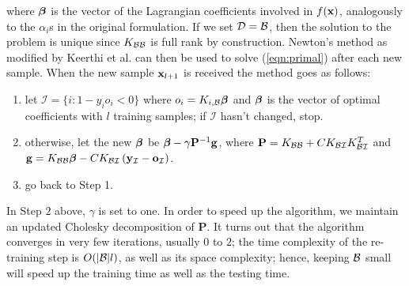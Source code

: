 \noindent where $\boldsymbol{\beta}$ is the vector of the Lagrangian coefficients involved
in $f(\mathbf{x})$, analogously to the $\alpha_i$s in the original
formulation. If we set $\mathcal{D} = \mathcal{B}$, then the solution to the problem is
unique since $K_{\mathcal{B}\mathcal{B}}$ is full rank by construction. Newton's method
as modified by Keerthi et al. \cite{KeerthiDC05,KeerthiCDC06} can then
be used to solve (\ref{eqn:primal}) after each new sample. When the
new sample $\mathbf{x}_{l+1}$ is received the method goes as follows:

\begin{enumerate}

   \item let $\mathcal{I} = \{ i: 1-y_i o_i<0 \}$ where $o_i =
     K_{i,\mathcal{B}} \boldsymbol{\beta}$ and $\boldsymbol{\beta}$ is the vector of optimal coefficients
     with $l$ training samples; if $\mathcal{I}$ hasn't changed, stop.

   \item otherwise, let the new $\boldsymbol{\beta}$ be $\boldsymbol{\beta} - \gamma
     \mathbf{P}^{-1}\mathbf{g}$, where $\mathbf{P} = K_{\mathcal{B}\mathcal{B}} + C
     K_{\mathcal{B}\mathcal{I}} K_{\mathcal{B}\mathcal{I}}^T$ and $\mathbf{g} = K_{\mathcal{B}\mathcal{B}}
     \boldsymbol{\beta} - C K_{\mathcal{B}\mathcal{I}} \left(
     \mathbf{y}_{\mathcal{I}}-\mathbf{o}_{\mathcal{I}}\right)$.

   \item go back to Step 1.

\end{enumerate}

In Step $2$ above, $\gamma$ is set to one. In order to speed up the
algorithm, we maintain an updated Cholesky decomposition of
$\mathbf{P}$. It turns out that the algorithm converges in very few
iterations, usually $0$ to $2$; the time complexity of the re-training
step is $O(|\mathcal{B}|l)$, as well as its space complexity; hence, keeping
$\mathcal{B}$ small will speed up the training time as well as the testing
time.
